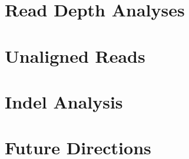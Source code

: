 \documentclass[12pt]{article}
\begin{document}
	\section{Read Depth Analyses}
	\newpage

%
%
	\section{Unaligned Reads}	
	\newpage

%
%
	\section{Indel Analysis}
	\newpage

%
%
	\section{Future Directions}
	\newpage
	
	
	
\end{document}
